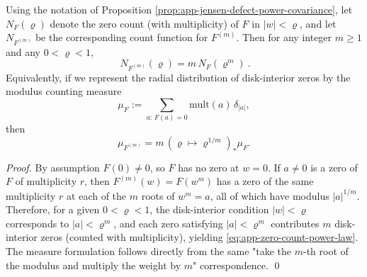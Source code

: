 \begin{corollary}\label{cor:app-jensen-zero-count-power-law}
Using the notation of Proposition \ref{prop:app-jensen-defect-power-covariance},
let \(N_F(\varrho)\) denote the zero count (with multiplicity) of \(F\) in \(|w|<\varrho\), and let \(N_{F^{(m)}}\) be the corresponding count function for \(F^{(m)}\).
Then for any integer \(m\ge 1\) and any \(0<\varrho<1\),
\begin{equation}\label{eq:app-zero-count-power-law}
\boxed{\ N_{F^{(m)}}(\varrho)=m\,N_F(\varrho^m)\ }.
\end{equation}
Equivalently, if we represent the radial distribution of disk-interior zeros by the modulus counting measure
\[
\mu_F:=\sum_{a:\,F(a)=0}\mathrm{mult}(a)\,\delta_{|a|},
\]
then
\[
\mu_{F^{(m)}}=m\,(\varrho\mapsto \varrho^{1/m})_{\ast}\mu_F.
\]
\end{corollary}
\begin{proof}
By assumption \(F(0)\neq 0\), so \(F\) has no zero at \(w=0\).
If \(a\neq 0\) is a zero of \(F\) of multiplicity \(r\), then \(F^{(m)}(w)=F(w^m)\) has a zero of the same multiplicity \(r\) at each of the \(m\) roots of \(w^m=a\), all of which have modulus \(|a|^{1/m}\).
Therefore, for a given \(0<\varrho<1\), the disk-interior condition \(|w|<\varrho\) corresponds to \(|a|<\varrho^m\), and each zero satisfying \(|a|<\varrho^m\) contributes \(m\) disk-interior zeros (counted with multiplicity), yielding \eqref{eq:app-zero-count-power-law}.
The measure formulation follows directly from the same "take the \(m\)-th root of the modulus and multiply the weight by \(m\)" correspondence. \qed
\end{proof}

